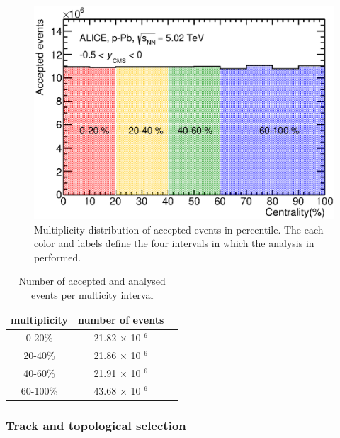 \begin{figure}[htbp]
\begin{center}
\includegraphics[width=10.cm]{./Version1/FigChapter5/Selection/Centrality.eps}
\caption{ Multiplicity distribution of accepted events in percentile. The each color and labels define the four intervals in which the analysis in performed.}
\label{fig:Centrality}
\end{center}
\end{figure}



\begin{table}[htp]
\begin{center}
\begin{tabular}{|c|c|c|}
\hline
multiplicity & number of events\\
\hline
\hline
 0-20\% &21.82 $\times$ 10 $^{6}$\\
\hline
 20-40\% &21.86 $\times$ 10 $^{6}$\\
\hline
 40-60\% &21.91 $\times$ 10 $^{6}$\\
\hline
 60-100\% &43.68 $\times$ 10 $^{6}$\\
\hline
\end{tabular}
\caption{Number of accepted and analysed events per multicity interval}\label{table:NCentralityEvent}
\end{center}
\end{table}


\newpage
\subsubsection{Track and topological selection}\label{sec:pPb:Cut}

